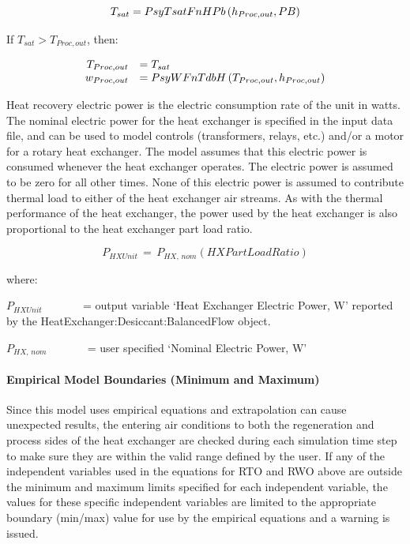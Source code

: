 \begin{equation}
  T_{sat} = PsyTsatFnHPb \PB{h_{Proc,out},PB}
\end{equation}

If $T_{sat}>T_{Proc,out}$, then:

\begin{equation}
  \begin{array}{rl}
    T_{Proc,out} &= T_{sat} \\
    w_{Proc,out} &= PsyWFnTdbH \PB{T_{Proc,out},h_{Proc,out}}
  \end{array}
\end{equation}  

Heat recovery electric power is the electric consumption rate of the unit in watts. The nominal electric power for the heat exchanger is specified in the input data file, and can be used to model controls (transformers, relays, etc.) and/or a motor for a rotary heat exchanger. The model assumes that this electric power is consumed whenever the heat exchanger operates. The electric power is assumed to be zero for all other times. None of this electric power is assumed to contribute thermal load to either of the heat exchanger air streams. As with the thermal performance of the heat exchanger, the power used by the heat exchanger is also proportional to the heat exchanger part load ratio.

\begin{equation}
{P_{HXUnit}}\, = \,{P_{HX,\,nom}}\left( {HXPartLoadRatio} \right)
\end{equation}

where:

\({P_{HXUnit}}\) ~~~~~~ = output variable `Heat Exchanger Electric Power, W' reported by the HeatExchanger:Desiccant:BalancedFlow object.

\({P_{HX,\,nom}}\) ~~~~~~ = user specified `Nominal Electric Power, W'

\paragraph{Empirical Model Boundaries (Minimum and Maximum)}\label{empirical-model-boundaries-minimum-and-maximum}

Since this model uses empirical equations and extrapolation can cause unexpected results, the entering air conditions to both the regeneration and process sides of the heat exchanger are checked during each simulation time step to make sure they are within the valid range defined by the user. If any of the independent variables used in the equations for RTO and RWO above are outside the minimum and maximum limits specified for each independent variable, the values for these specific independent variables are limited to the appropriate boundary (min/max) value for use by the empirical equations and a warning is issued.

